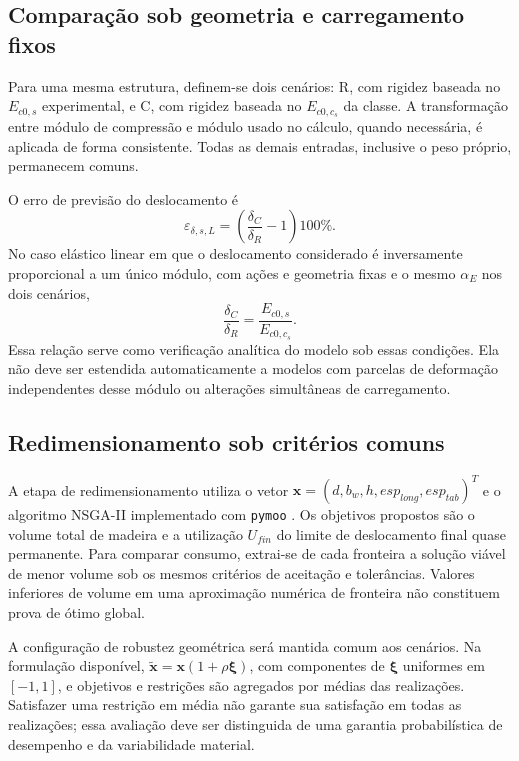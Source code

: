 

\subsection{Comparação sob geometria e carregamento fixos}\label{sec:geometria_fixa}

Para uma mesma estrutura, definem-se dois cenários: R, com rigidez baseada no $E_{c0,s}$ experimental, e C, com rigidez baseada no $E_{c0,c_s}$ da classe. A transformação entre módulo de compressão e módulo usado no cálculo, quando necessária, é aplicada de forma consistente. Todas as demais entradas, inclusive o peso próprio, permanecem comuns.

O erro de previsão do deslocamento é
\begin{equation}
\varepsilon_{\delta,s,L}=\left(\frac{\delta_C}{\delta_R}-1\right)100\%.
\label{eq:erro_delta}
\end{equation}
No caso elástico linear em que o deslocamento considerado é inversamente proporcional a um único módulo, com ações e geometria fixas e o mesmo $\alpha_E$ nos dois cenários,
\begin{equation}
\frac{\delta_C}{\delta_R}=\frac{E_{c0,s}}{E_{c0,c_s}}.
\label{eq:razao_delta}
\end{equation}
Essa relação serve como verificação analítica do modelo sob essas condições. Ela não deve ser estendida automaticamente a modelos com parcelas de deformação independentes desse módulo ou alterações simultâneas de carregamento.

\subsection{Redimensionamento sob critérios comuns}\label{sec:optimisation}

A etapa de redimensionamento utiliza o vetor $\mathbf{x}=(d,b_w,h,esp_{long},esp_{tab})^T$ e o algoritmo NSGA-II \parencite{Deb2002} implementado com \texttt{pymoo} \parencite{blank2020}. Os objetivos propostos são o volume total de madeira e a utilização $U_{fin}$ do limite de deslocamento final quase permanente. Para comparar consumo, extrai-se de cada fronteira a solução viável de menor volume sob os mesmos critérios de aceitação e tolerâncias. Valores inferiores de volume em uma aproximação numérica de fronteira não constituem prova de ótimo global.

A configuração de robustez geométrica será mantida comum aos cenários. Na formulação disponível, $\widetilde{\mathbf{x}}=\mathbf{x}(1+\rho\boldsymbol{\xi})$, com componentes de $\boldsymbol{\xi}$ uniformes em $[-1,1]$, e objetivos e restrições são agregados por médias das realizações. Satisfazer uma restrição em média não garante sua satisfação em todas as realizações; essa avaliação deve ser distinguida de uma garantia probabilística de desempenho e da variabilidade material.

